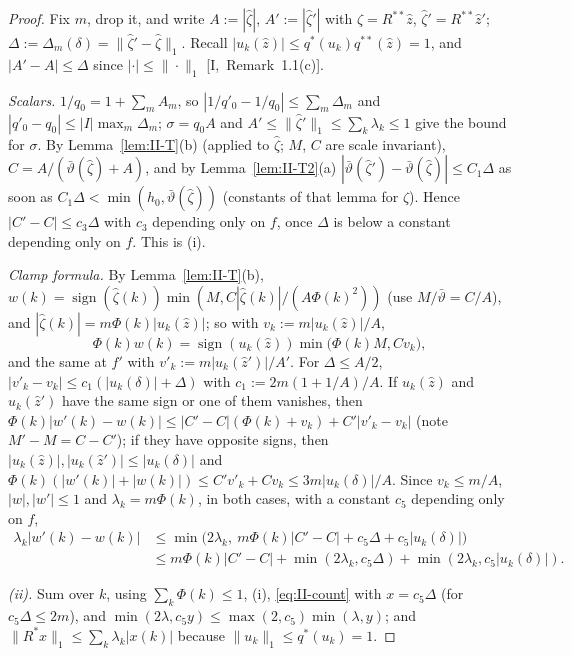 \documentclass[10pt]{amsart}
\theoremstyle{definition}
\theoremstyle{remark}
\newcommand{\sgn}{\operatorname{sign}}
\newcommand{\zh}{\hat z}
\begin{document}
\begin{proof}
Fix $m$, drop it, and write $A:=|\hat\zeta|$, $A':=|\hat\zeta'|$ with
$\hat\zeta=R^{**}\zh$, $\hat\zeta'=R^{**}\zh'$; $\Delta:=\Delta_m(\delta)=
\|\hat\zeta'-\hat\zeta\|_1$.  Recall $|u_k(\zh)|\le q^*(u_k)q^{**}(\zh)=1$, and
$|A'-A|\le\Delta$ since $|\cdot|\le\|\cdot\|_1$ [I,~Remark~1.1(c)].

\emph{Scalars.}  $1/q_0=1+\sum_mA_m$, so $|1/q'_0-1/q_0|\le\sum_m\Delta_m$ and
$|q'_0-q_0|\le|I|\max_m\Delta_m$; $\sigma=q_0A$ and $A'\le\|\hat\zeta'\|_1\le
\sum_k\lambda_k\le1$ give the bound for $\sigma$.  By Lemma~\ref{lem:II-T}(b)
(applied to $\hat\zeta$; $M$, $C$ are scale invariant),
$C=A/(\bar\vartheta(\hat\zeta)+A)$, and by Lemma~\ref{lem:II-T2}(a)
$|\bar\vartheta(\hat\zeta')-\bar\vartheta(\hat\zeta)|\le C_1\Delta$ as soon as
$C_1\Delta<\min(h_0,\bar\vartheta(\hat\zeta))$ (constants of that lemma for
$\hat\zeta$).  Hence $|C'-C|\le c_3\Delta$ with $c_3$ depending only on $f$,
once $\Delta$ is below a constant depending only on $f$.  This is (i).

\emph{Clamp formula.}  By Lemma~\ref{lem:II-T}(b), $w(k)=\sgn(\hat\zeta(k))
\min(M,C|\hat\zeta(k)|/(A\Phi(k)^2))$ (use $M/\bar\vartheta=C/A$), and
$|\hat\zeta(k)|=m\Phi(k)|u_k(\zh)|$; so with $v_k:=m|u_k(\zh)|/A$,
\[
 \Phi(k)w(k)=\sgn(u_k(\zh))\min\big(\Phi(k)M,Cv_k\big),
\]
and the same at $f'$ with $v'_k:=m|u_k(\zh')|/A'$.  For $\Delta\le A/2$,
$|v'_k-v_k|\le c_1(|u_k(\delta)|+\Delta)$ with $c_1:=2m(1+1/A)/A$.  If
$u_k(\zh)$ and $u_k(\zh')$ have the same sign or one of them vanishes, then
$\Phi(k)|w'(k)-w(k)|\le|C'-C|(\Phi(k)+v_k)+C'|v'_k-v_k|$ (note $M'-M=C-C'$);
if they have opposite signs, then $|u_k(\zh)|,|u_k(\zh')|\le|u_k(\delta)|$
and $\Phi(k)(|w'(k)|+|w(k)|)\le C'v'_k+Cv_k\le3m|u_k(\delta)|/A$.  Since
$v_k\le m/A$, $|w|,|w'|\le1$ and $\lambda_k=m\Phi(k)$, in both cases, with a
constant $c_5$ depending only on $f$,
\[
 \begin{aligned}
 \lambda_k|w'(k)-w(k)|&\le\min\big(2\lambda_k,\ m\Phi(k)|C'-C|+c_5\Delta+
 c_5|u_k(\delta)|\big)\\
 &\le m\Phi(k)|C'-C|+\min(2\lambda_k,c_5\Delta)+
 \min(2\lambda_k,c_5|u_k(\delta)|).
 \end{aligned}
\]

\emph{(ii).}  Sum over $k$, using $\sum_k\Phi(k)\le1$, (i),
\eqref{eq:II-count} with $x=c_5\Delta$ (for $c_5\Delta\le2m$), and
$\min(2\lambda,c_5y)\le\max(2,c_5)\min(\lambda,y)$; and
$\|R^*x\|_1\le\sum_k\lambda_k|x(k)|$ because $\|u_k\|_1\le q^*(u_k)=1$.


\end{proof}
\end{document}
